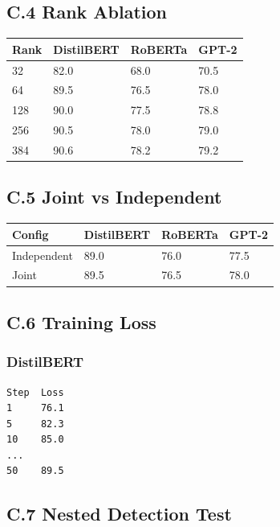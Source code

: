 \subsection{C.4 Rank Ablation}

\begin{table}[H]
\centering
\small
\begin{tabular}{llll}
\toprule
\textbf{Rank} & \textbf{DistilBERT} & \textbf{RoBERTa} & \textbf{GPT-2} \\
\midrule
32 & 82.0 & 68.0 & 70.5 \\
64 & 89.5 & 76.5 & 78.0 \\
128 & 90.0 & 77.5 & 78.8 \\
256 & 90.5 & 78.0 & 79.0 \\
384 & 90.6 & 78.2 & 79.2 \\
\bottomrule
\end{tabular}
\end{table}

\subsection{C.5 Joint vs Independent}

\begin{table}[H]
\centering
\small
\begin{tabular}{llll}
\toprule
\textbf{Config} & \textbf{DistilBERT} & \textbf{RoBERTa} & \textbf{GPT-2} \\
\midrule
Independent & 89.0 & 76.0 & 77.5 \\
Joint & 89.5 & 76.5 & 78.0 \\
\bottomrule
\end{tabular}
\end{table}

\subsection{C.6 Training Loss}

\subsubsection{DistilBERT}
\begin{lstlisting}
Step  Loss
1     76.1
5     82.3
10    85.0
...
50    89.5
\end{lstlisting}

\subsection{C.7 Nested Detection Test}

